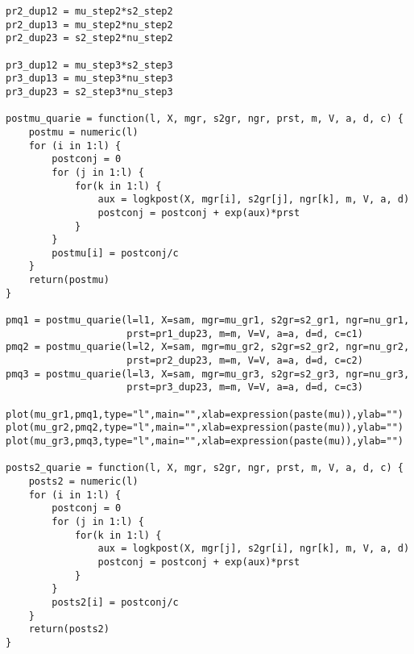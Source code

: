 \newpage

\begin{verbatim}
pr2_dup12 = mu_step2*s2_step2
pr2_dup13 = mu_step2*nu_step2
pr2_dup23 = s2_step2*nu_step2

pr3_dup12 = mu_step3*s2_step3
pr3_dup13 = mu_step3*nu_step3
pr3_dup23 = s2_step3*nu_step3

postmu_quarie = function(l, X, mgr, s2gr, ngr, prst, m, V, a, d, c) {
	postmu = numeric(l)
	for (i in 1:l) {
		postconj = 0
		for (j in 1:l) {
			for(k in 1:l) {
				aux = logkpost(X, mgr[i], s2gr[j], ngr[k], m, V, a, d)
				postconj = postconj + exp(aux)*prst
			}
		}
		postmu[i] = postconj/c
	}
	return(postmu)
}

pmq1 = postmu_quarie(l=l1, X=sam, mgr=mu_gr1, s2gr=s2_gr1, ngr=nu_gr1,
					 prst=pr1_dup23, m=m, V=V, a=a, d=d, c=c1)
pmq2 = postmu_quarie(l=l2, X=sam, mgr=mu_gr2, s2gr=s2_gr2, ngr=nu_gr2,
					 prst=pr2_dup23, m=m, V=V, a=a, d=d, c=c2)
pmq3 = postmu_quarie(l=l3, X=sam, mgr=mu_gr3, s2gr=s2_gr3, ngr=nu_gr3,
					 prst=pr3_dup23, m=m, V=V, a=a, d=d, c=c3)

plot(mu_gr1,pmq1,type="l",main="",xlab=expression(paste(mu)),ylab="")
plot(mu_gr2,pmq2,type="l",main="",xlab=expression(paste(mu)),ylab="")
plot(mu_gr3,pmq3,type="l",main="",xlab=expression(paste(mu)),ylab="")

posts2_quarie = function(l, X, mgr, s2gr, ngr, prst, m, V, a, d, c) {
	posts2 = numeric(l)
	for (i in 1:l) {
		postconj = 0
		for (j in 1:l) {
			for(k in 1:l) {
				aux = logkpost(X, mgr[j], s2gr[i], ngr[k], m, V, a, d)
				postconj = postconj + exp(aux)*prst
			}
		}
		posts2[i] = postconj/c
	}
	return(posts2)
}

\end{verbatim}

\newpage

